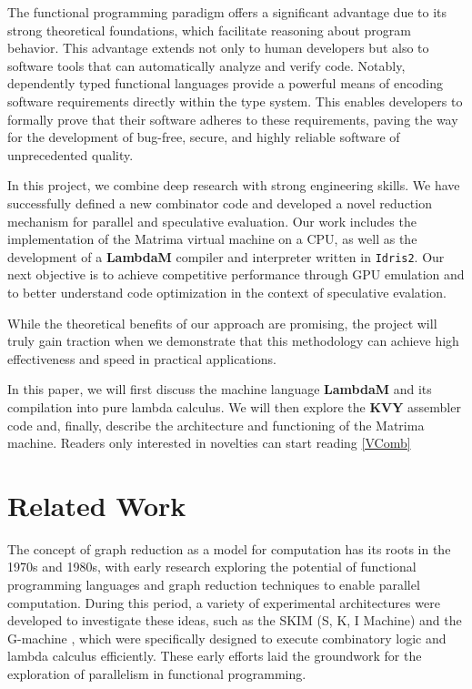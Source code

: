 \documentclass{IEEEtran}
\begin{document}
\par The functional programming paradigm offers a significant advantage due to its strong theoretical foundations, which facilitate reasoning about program behavior. This advantage extends not only to human developers but also to software tools that can automatically analyze and verify code. Notably, dependently typed functional languages provide a powerful means of encoding software requirements directly within the type system. This enables developers to formally prove that their software adheres to these requirements, paving the way for the development of bug-free, secure, and highly reliable software of unprecedented quality.

\par In this project, we combine deep research with strong engineering skills. We have successfully defined a new combinator code and developed a novel reduction mechanism for parallel and speculative evaluation. Our work includes the implementation of the Matrima virtual machine on a CPU, as well as the development of a \textbf{LambdaM} compiler and interpreter written in \texttt{Idris2}. Our next objective is to achieve competitive performance through GPU emulation and to better understand code optimization in the context of speculative evalation.

\par While the theoretical benefits of our approach are promising, the project will truly gain traction when we demonstrate that this methodology can achieve high effectiveness and speed in practical applications.

\par In this paper, we will first discuss the machine language \textbf{LambdaM} and its compilation into pure lambda calculus. We will then explore the \textbf{KVY} assembler code and, finally, describe the architecture and functioning of the Matrima machine. Readers only interested in novelties can start reading \ref{VComb}

\section{Related Work}

\par The concept of graph reduction as a model for computation has its roots in the 1970s and 1980s, with early research exploring the potential of functional programming languages and graph reduction techniques to enable parallel computation. During this period, a variety of experimental architectures were developed to investigate these ideas, such as the SKIM (S, K, I Machine) \cite{SKIM} and the G-machine \cite{GMachine}, which were specifically designed to execute combinatory logic and lambda calculus efficiently. These early efforts laid the groundwork for the exploration of parallelism in functional programming.
\end{document}
